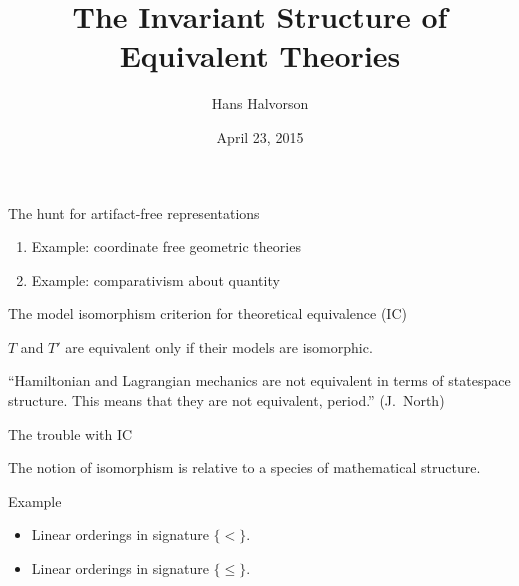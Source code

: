 \documentclass[17pt]{beamer}
\title{The Invariant Structure of Equivalent Theories}
\author{Hans Halvorson}
\date{April 23, 2015}
\begin{document}
\def\2{\mathcal}
\def\7{\mathfrak}
\begin{frame}

\maketitle

\end{frame}

\begin{frame}{The hunt for artifact-free representations}

\begin{enumerate}
\item Example: coordinate free geometric theories 
\item Example: comparativism about quantity 
\end{enumerate}

\end{frame}

\begin{frame}{The model isomorphism criterion for theoretical
    equivalence (IC)}

\begin{exampleblock}{}
  $T$ and $T'$ are equivalent only if their models are isomorphic.
\end{exampleblock}

\end{frame}

\begin{frame}

  ``Hamiltonian and Lagrangian mechanics are not equivalent in terms
  of statespace structure.  This means that they are not equivalent,
  period.'' (J.\ North)


\end{frame}

\begin{frame}{The trouble with IC}

  The notion of isomorphism is relative to a species of mathematical
  structure.


\end{frame}

\begin{frame}{Example}

\begin{itemize}
\item Linear orderings in signature $\{ < \}$.
\item Linear orderings in signature $\{ \leq \}$. 
\end{itemize}


\end{frame}
\end{document}

